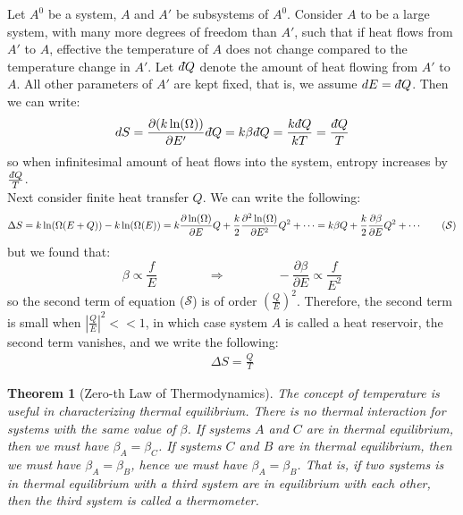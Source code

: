 \documentclass[11pt]{article}
\theoremstyle{break}
\theoremstyle{break}
\newtheorem{thm}{Theorem}[section]
\newcommand{\dbar}{d\hspace*{-0.08em}\bar{}\hspace*{0.1em}}
\begin{document}
Let $A^0$ be a system, $A$ and $A'$ be subsystems of $A^0$. Consider $A$ to be a large system, with many more degrees of freedom than $A'$, such that if heat flows from $A'$ to $A$, effective the temperature of $A$ does not change compared to the temperature change in $A'$. Let $\dbar Q$ denote the amount of heat flowing from $A'$ to $A$. All other parameters of $A'$ are kept fixed, that is, we assume $dE = \dbar Q$. Then we can write:
\begin{align*}
dS = \frac{\partial (k\ln(\Omega))}{\partial E'} \dbar Q = k \beta \dbar Q = \frac{k\dbar Q}{kT} = \frac{\dbar Q}{T}
\end{align*}
so when infinitesimal amount of heat flows into the system, entropy increases by $\frac{\dbar Q}{T}$. \\
Next consider finite heat transfer $Q$. We can write the following:
\begin{align*}
\Delta S = k\ln(\Omega(E+Q)) - k\ln(\Omega(E)) = k\frac{\partial \ln(\Omega)}{\partial E} Q + \frac{k}{2}  \frac{\partial^2 \ln(\Omega)}{\partial E^2}Q^2 + \cdots = k\beta Q + \frac{k}{2}\frac{\partial \beta}{\partial E} Q^2+\cdots  \tag{$\mathcal{S}$}
\end{align*}
but we found that: $$\beta \propto \frac{f}{E} \qquad \qquad \Rightarrow \qquad\qquad -\frac{\partial \beta}{\partial E} \propto \frac{f}{E^2}$$ 
so the second term of equation ($\mathcal{S}$) is of order $\left(\frac{Q}{E}\right)^2$. Therefore, the second term is small when $|\frac{Q}{E}|^2 <<1$, in which case system $A$ is called a heat reservoir, the second term vanishes, and we write the following:
\begin{align*}
 \Delta S = \frac{Q}{T}
\end{align*}


\begin{thm}[Zero-th Law of Thermodynamics]
The concept of temperature is useful in characterizing thermal equilibrium. There is no thermal interaction for systems with the same value of $\beta$. If systems $A$ and $C$ are in thermal equilibrium, then we must have $\beta_A = \beta_C$. If systems $C$ and $B$ are in thermal equilibrium, then we must have $\beta_A = \beta_B$, hence we must have $\beta_A = \beta_B$. That is, if two systems is in thermal equilibrium with a third system are in equilibrium with each other, then the third system is called a thermometer. 
\end{thm}
\newpage
\end{document}
